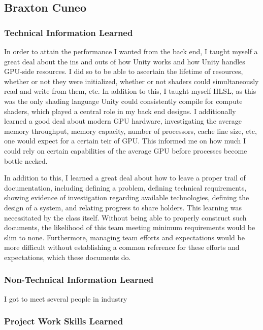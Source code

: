\documentclass[onecolumn, draftclsnofoot,10pt, compsoc]{IEEEtran}
\begin{document}
\subsection{Braxton Cuneo}

\subsubsection{Technical Information Learned}

In order to attain the performance I wanted from the back end, I taught myself a great deal about the ins and outs of how Unity works and how Unity handles GPU-side resources. I did so to be able to ascertain the lifetime of resources, whether or not they were initialized, whether or not shaders could simultaneously read and write from them, etc. In addition to this, I taught myself HLSL, as this was the only shading language Unity could consistently compile for compute shaders, which played a central role in my back end designs. I additionally learned a good deal about modern GPU hardware, investigating the average memory throughput, memory capacity, number of processors, cache line size, etc, one would expect for a certain teir of GPU. This informed me on how much I could rely on certain capabilities of the average GPU before processes become bottle necked.

In addition to this, I learned a great deal about how to leave a proper trail of documentation, including defining a problem, defining technical requirements, showing evidence of investigation regarding available technologies, defining the design of a system, and relating progress to share holders. This learning was necessitated by the class itself. Without being able to properly construct such documents, the likelihood of this team meeting minimum requirements would be slim to none. Furthermore, managing team efforts and expectations would be more difficult without establishing a common reference for these efforts and expectations, which these documents do.


\subsubsection{Non-Technical Information Learned}

I got to meet several people in industry 


\subsubsection{Project Work Skills Learned}
\end{document}
